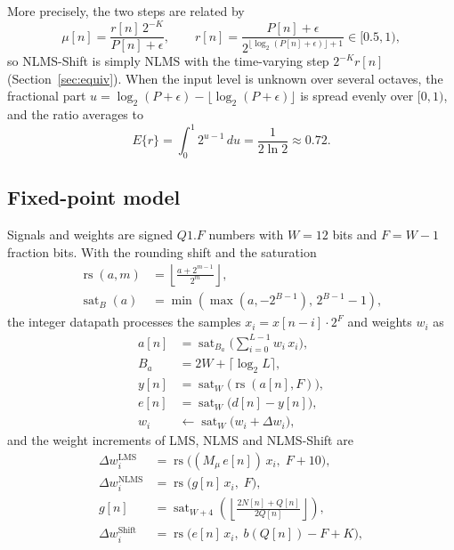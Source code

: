\smallskip\noindent More precisely, the two steps are related by
\begin{equation}
\mu[n]=\frac{r[n]\,2^{-K}}{P[n]+\epsilon},\qquad
r[n]=\frac{P[n]+\epsilon}{2^{\lfloor\log_2(P[n]+\epsilon)\rfloor+1}}\in[0.5,1),
\label{eq:ratio}
\end{equation}
so NLMS-Shift is simply NLMS with the time-varying step $2^{-K}r[n]$ (Section~\ref{sec:equiv}). When the
input level is unknown over several octaves, the fractional part
$u=\log_2(P+\epsilon)-\lfloor\log_2(P+\epsilon)\rfloor$ is spread evenly over $[0,1)$, and the ratio
averages to
\begin{equation}
E\{r\}=\int_0^1 2^{u-1}\,du=\frac{1}{2\ln 2}\approx 0.72 .
\label{eq:er}
\end{equation}

\subsection{Fixed-point model}
Signals and weights are signed $Q1.F$ numbers with $W=12$ bits and $F=W-1$ fraction bits. With the
rounding shift and the saturation
\begin{align}
\operatorname{rs}(a,m) &= \left\lfloor \frac{a+2^{m-1}}{2^m}\right\rfloor, \label{eq:rs}\\
\operatorname{sat}_B(a) &= \min\!\left(\max\!\left(a,-2^{B-1}\right),\,2^{B-1}-1\right), \label{eq:sat}
\end{align}
the integer datapath processes the samples $x_i=x[n-i]\cdot2^F$ and weights $w_i$ as
\begin{align}
a[n] &= \operatorname{sat}_{B_a}\Big(\sum_{i=0}^{L-1} w_i\,x_i\Big), \label{eq:acc}\\
B_a &= 2W+\lceil\log_2 L\rceil, \label{eq:ba}\\
y[n] &= \operatorname{sat}_W\big(\operatorname{rs}(a[n],F)\big), \label{eq:yq}\\
e[n] &= \operatorname{sat}_W\big(d[n]-y[n]\big), \label{eq:ye}\\
w_i &\leftarrow \operatorname{sat}_W\big(w_i+\Delta w_i\big), \label{eq:wupd}
\end{align}
and the weight increments of LMS, NLMS and NLMS-Shift are
\begin{align}
\Delta w_i^{\text{LMS}} &= \operatorname{rs}\big((M_\mu\,e[n])\,x_i,\;F+10\big), \label{eq:dw_lms}\\
\Delta w_i^{\text{NLMS}} &= \operatorname{rs}\big(g[n]\,x_i,\;F\big), \label{eq:dw_nlms}\\
g[n] &= \operatorname{sat}_{W+4}\!\left(\left\lfloor\frac{2N[n]+Q[n]}{2Q[n]}\right\rfloor\right), \label{eq:g}\\
\Delta w_i^{\text{Shift}} &= \operatorname{rs}\big(e[n]\,x_i,\;b(Q[n])-F+K\big), \label{eq:dw_shift}
\end{align}
